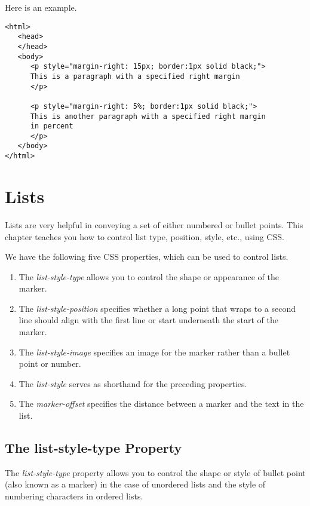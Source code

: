 \documentclass[a4paper,oneside]{book}
\numberwithin{equation}{chapter}
\begin{document}
Here is an example.
\begin{verbatim}
<html>
   <head>
   </head>
   <body>
      <p style="margin-right: 15px; border:1px solid black;"> 
      This is a paragraph with a specified right margin 
      </p> 
      
      <p style="margin-right: 5%; border:1px solid black;"> 
      This is another paragraph with a specified right margin 
      in percent 
      </p>
   </body>
</html> 
\end{verbatim}
\section{Lists}
Lists are very helpful in conveying a set of either numbered or bullet points. This chapter teaches you how to control list type, position, style, etc., using CSS.

We have the following five CSS properties, which can be used to control lists.
\begin{enumerate}
\item The \textit{list-style-type} allows you to control the shape or appearance of the marker.
\item The \textit{list-style-position} specifies whether a long point that wraps to a second line should align with the first line or start underneath the start of the marker.
\item The \textit{list-style-image} specifies an image for the marker rather than a bullet point or number.
\item The \textit{list-style} serves as shorthand for the preceding properties.
\item The \textit{marker-offset} specifies the distance between a marker and the text in the list.
\end{enumerate}
\subsection{The list-style-type Property}
The \textit{list-style-type} property allows you to control the shape or style of bullet point (also known as a marker) in the case of unordered lists and the style of numbering characters in ordered lists.
\end{document}
